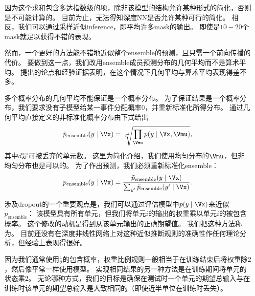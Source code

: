 
因为这个求和包含多达指数级的项，除非该模型的结构允许某种形式的简化，否则是不可能计算的。
目前为止，无法得知深度\gls{NN}是否允许某种可行的简化。
相反，我们可以通过采样近似\gls{inference}，即平均许多\gls{mask}的输出。
即使是$10-20$个\gls{mask}就足以获得不错的表现。

然而，一个更好的方法能不错地近似整个\gls{ensemble}的预测，且只需一个前向传播的代价。
要做到这一点，我们改用\gls{ensemble}成员预测分布的几何平均而不是算术平均。
\cite{WardeFarley-et-al-2014}提出的论点和经验证据表明，在这个情况下几何平均与算术平均表现得差不多。

多个概率分布的几何平均不能保证是一个概率分布。
为了保证结果是一个概率分布，我们要求没有子模型给某一事件分配概率0，并重新标准化所得分布。
通过几何平均直接定义的非标准化概率分布由下式给出
\begin{align}
\tilde{p}_{\text{ensemble}}(y \mid \Vx) = \sqrt[2^d]{\prod_{\Vmu} p(y \mid \Vx, \Vmu)},
\end{align}
其中$d$是可被丢弃的单元数。
这里为简化介绍，我们使用均匀分布的$\Vmu$，但非均匀分布也是可以的。
为了作出预测，我们必须重新标准化\gls{ensemble}：
\begin{align}
p_{\text{ensemble}}(y \mid \Vx)  = \frac{\tilde{p}_{\text{ensemble}}(y \mid \Vx)}
 {\sum_{y'}\tilde{p}_{\text{ensemble}}(y' \mid \Vx) }.
\end{align}
 
涉及\gls{dropout}的一个重要观点\citep{Hinton-et-al-2012c}是，我们可以通过评估模型中$p(y \mid \Vx)$来近似$ p_{\text{ensemble}}$：
该模型具有所有单元，但我们将单元$i$的输出的权重乘以单元$i$的被包含概率。
这个修改的动机是得到从该单元输出的正确期望值。
我们把这种方法称为。
目前还没有在深度非线性网络上对这种近似推断规则的准确性作任何理论分析，但经验上表现得很好。

 
因为我们通常使用$\frac{1}{2}$的包含概率，权重比例规则一般相当于在训练结束后将权重除$2$，然后像平常一样使用模型。
实现相同结果的另一种方法是在训练期间将单元的状态乘$2$。
无论哪种方式，我们的目标是确保在测试时一个单元的期望总输入与在训练时该单元的期望总输入是大致相同的（即使近半单位在训练时丢失）。

